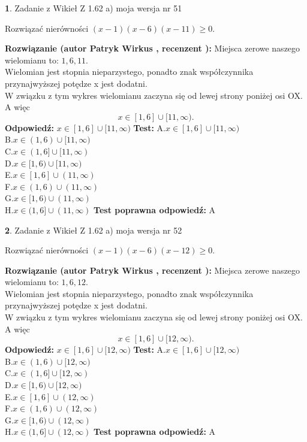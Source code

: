 \documentclass[12pt, a4paper]{article}
\theoremstyle{definition} %
\newtheorem{zad}{}
\newcommand{\zadStart}[1]{\begin{zad}#1\newline}
\newcommand{\zadStop}{\end{zad}}
\newcommand{\rozwStart}[2]{\noindent \textbf{Rozwiązanie (autor #1 , recenzent #2): }\newline}
\newcommand{\rozwStop}{\newline}
\newcommand{\odpStart}{\noindent \textbf{Odpowiedź:}\newline}
\newcommand{\odpStop}{\newline}
\newcommand{\testStart}{\noindent \textbf{Test:}\newline}
\newcommand{\testStop}{\newline}
\newcommand{\kluczStart}{\noindent \textbf{Test poprawna odpowiedź:}\newline}
\newcommand{\kluczStop}{\newline}
\begin{document}
\zadStart{Zadanie z Wikieł Z 1.62 a) moja wersja nr 51}

Rozwiązać nierówności $(x-1)(x-6)(x-11)\ge0$.
\zadStop
\rozwStart{Patryk Wirkus}{}
Miejsca zerowe naszego wielomianu to: $1, 6, 11$.\\
Wielomian jest stopnia nieparzystego, ponadto znak współczynnika przy\linebreak najwyższej potędze x jest dodatni.\\ W związku z tym wykres wielomianu zaczyna się od lewej strony poniżej osi OX. A więc $$x \in [1,6] \cup [11,\infty).$$
\rozwStop
\odpStart
$x \in [1,6] \cup [11,\infty)$
\odpStop
\testStart
A.$x \in [1,6] \cup [11,\infty)$\\
B.$x \in (1,6) \cup [11,\infty)$\\
C.$x \in (1,6] \cup [11,\infty)$\\
D.$x \in [1,6) \cup [11,\infty)$\\
E.$x \in [1,6] \cup (11,\infty)$\\
F.$x \in (1,6) \cup (11,\infty)$\\
G.$x \in [1,6) \cup (11,\infty)$\\
H.$x \in (1,6] \cup (11,\infty)$
\testStop
\kluczStart
A
\kluczStop



\zadStart{Zadanie z Wikieł Z 1.62 a) moja wersja nr 52}

Rozwiązać nierówności $(x-1)(x-6)(x-12)\ge0$.
\zadStop
\rozwStart{Patryk Wirkus}{}
Miejsca zerowe naszego wielomianu to: $1, 6, 12$.\\
Wielomian jest stopnia nieparzystego, ponadto znak współczynnika przy\linebreak najwyższej potędze x jest dodatni.\\ W związku z tym wykres wielomianu zaczyna się od lewej strony poniżej osi OX. A więc $$x \in [1,6] \cup [12,\infty).$$
\rozwStop
\odpStart
$x \in [1,6] \cup [12,\infty)$
\odpStop
\testStart
A.$x \in [1,6] \cup [12,\infty)$\\
B.$x \in (1,6) \cup [12,\infty)$\\
C.$x \in (1,6] \cup [12,\infty)$\\
D.$x \in [1,6) \cup [12,\infty)$\\
E.$x \in [1,6] \cup (12,\infty)$\\
F.$x \in (1,6) \cup (12,\infty)$\\
G.$x \in [1,6) \cup (12,\infty)$\\
H.$x \in (1,6] \cup (12,\infty)$
\testStop
\kluczStart
A
\kluczStop
\end{document}
